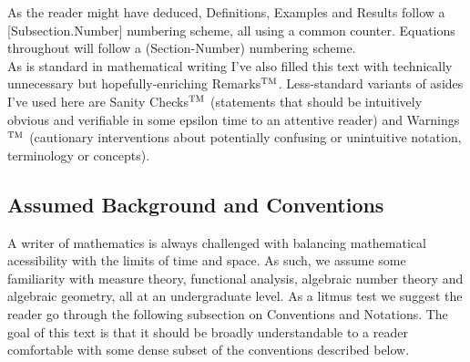 \documentclass[11pt, x11names, openany]{book}
\begin{document}
As the reader might have deduced, Definitions, Examples and Results follow a [Subsection.Number] numbering scheme, all using a common counter. Equations throughout will follow a (Section-Number) numbering scheme.\\

As is standard in mathematical writing I've also filled this text with technically unnecessary but hopefully-enriching Remarks$^{\textsc{TM}}$. Less-standard variants of asides I've used here are Sanity Checks$^{\textsc{TM}}$ (statements that should be intuitively obvious and verifiable in some epsilon time to an attentive reader) and Warnings$^{\textsc{TM}}$ (cautionary interventions about potentially confusing or unintuitive notation, terminology or concepts).\\

\subsection*{Assumed Background and Conventions}

A writer of mathematics is always challenged with balancing mathematical acessibility with the limits of time and space. As such, we assume some familiarity with measure theory, functional analysis, algebraic number theory and algebraic geometry, all at an undergraduate level. As a litmus test we suggest the reader go through the following subsection on Conventions and Notations. The goal of this text is that it should be broadly understandable to a reader comfortable with some dense subset of the conventions described below.\\
\end{document}
